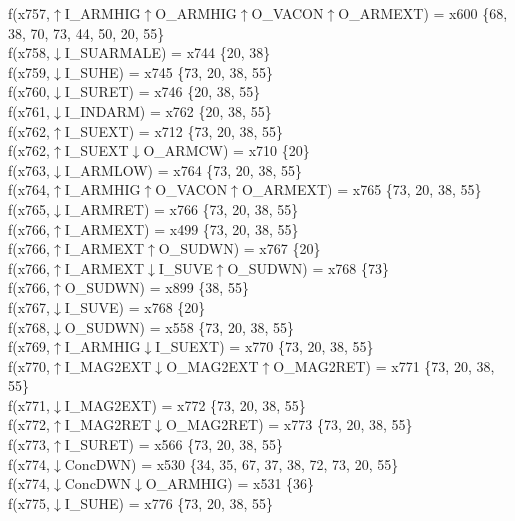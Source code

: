 f(x757,$\uparrow$I\_ARMHIG$\uparrow$O\_ARMHIG$\uparrow$O\_VACON$\uparrow$O\_ARMEXT) = x600 \{68, 38, 70, 73, 44, 50, 20, 55\} \\  
f(x758,$\downarrow$I\_SUARMALE) = x744 \{20, 38\} \\  
f(x759,$\downarrow$I\_SUHE) = x745 \{73, 20, 38, 55\} \\  
f(x760,$\downarrow$I\_SURET) = x746 \{20, 38, 55\} \\  
f(x761,$\downarrow$I\_INDARM) = x762 \{20, 38, 55\} \\  
f(x762,$\uparrow$I\_SUEXT) = x712 \{73, 20, 38, 55\} \\  
f(x762,$\uparrow$I\_SUEXT$\downarrow$O\_ARMCW) = x710 \{20\} \\  
f(x763,$\downarrow$I\_ARMLOW) = x764 \{73, 20, 38, 55\} \\  
f(x764,$\uparrow$I\_ARMHIG$\uparrow$O\_VACON$\uparrow$O\_ARMEXT) = x765 \{73, 20, 38, 55\} \\  
f(x765,$\downarrow$I\_ARMRET) = x766 \{73, 20, 38, 55\} \\  
f(x766,$\uparrow$I\_ARMEXT) = x499 \{73, 20, 38, 55\} \\  
f(x766,$\uparrow$I\_ARMEXT$\uparrow$O\_SUDWN) = x767 \{20\} \\  
f(x766,$\uparrow$I\_ARMEXT$\downarrow$I\_SUVE$\uparrow$O\_SUDWN) = x768 \{73\} \\  
f(x766,$\uparrow$O\_SUDWN) = x899 \{38, 55\} \\  
f(x767,$\downarrow$I\_SUVE) = x768 \{20\} \\  
f(x768,$\downarrow$O\_SUDWN) = x558 \{73, 20, 38, 55\} \\  
f(x769,$\uparrow$I\_ARMHIG$\downarrow$I\_SUEXT) = x770 \{73, 20, 38, 55\} \\  
f(x770,$\uparrow$I\_MAG2EXT$\downarrow$O\_MAG2EXT$\uparrow$O\_MAG2RET) = x771 \{73, 20, 38, 55\} \\  
f(x771,$\downarrow$I\_MAG2EXT) = x772 \{73, 20, 38, 55\} \\  
f(x772,$\uparrow$I\_MAG2RET$\downarrow$O\_MAG2RET) = x773 \{73, 20, 38, 55\} \\  
f(x773,$\uparrow$I\_SURET) = x566 \{73, 20, 38, 55\} \\  
f(x774,$\downarrow$ConcDWN) = x530 \{34, 35, 67, 37, 38, 72, 73, 20, 55\} \\  
f(x774,$\downarrow$ConcDWN$\downarrow$O\_ARMHIG) = x531 \{36\} \\  
f(x775,$\downarrow$I\_SUHE) = x776 \{73, 20, 38, 55\} \\  
